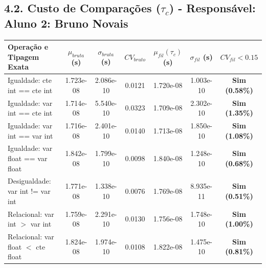 \documentclass[10pt,a4paper]{article}
\begin{document}
\subsection{4.2. Custo de Comparações ($\tau_c$) - Responsável: Aluno 2: Bruno Novais}
\begin{table}[H]
\centering\small
\begin{tabularx}{\textwidth}{Xcccccc}
\toprule
\textbf{Operação e Tipagem Exata} & $\mu_{bruta}$ (s) & $\sigma_{bruta}$ (s) & $CV_{bruto}$ & $\mu_{fil} (\tau_c)$ (s) & $\sigma_{fil}$ (s) & $CV_{fil} < 0.15$ \\ \midrule
Igualdade: cte int == cte int & 1.723e-08 & 2.086e-10 & 0.0121 & 1.720e-08 & 1.003e-10 & \textbf{Sim (0.58\%)} \\
Igualdade: var int == cte int & 1.714e-08 & 5.540e-10 & 0.0323 & 1.709e-08 & 2.302e-10 & \textbf{Sim (1.35\%)} \\
Igualdade: var int == var int & 1.716e-08 & 2.401e-10 & 0.0140 & 1.713e-08 & 1.850e-10 & \textbf{Sim (1.08\%)} \\
Igualdade: var float == var float & 1.842e-08 & 1.799e-10 & 0.0098 & 1.840e-08 & 1.248e-10 & \textbf{Sim (0.68\%)} \\
Desigualdade: var int != var int & 1.771e-08 & 1.338e-10 & 0.0076 & 1.769e-08 & 8.935e-11 & \textbf{Sim (0.51\%)} \\
Relacional: var int $>$ var int & 1.759e-08 & 2.291e-10 & 0.0130 & 1.756e-08 & 1.748e-10 & \textbf{Sim (1.00\%)} \\
Relacional: var float $<$ cte float & 1.824e-08 & 1.974e-10 & 0.0108 & 1.822e-08 & 1.475e-10 & \textbf{Sim (0.81\%)} \\
\bottomrule
\end{tabularx}
\end{table}
\end{document}
